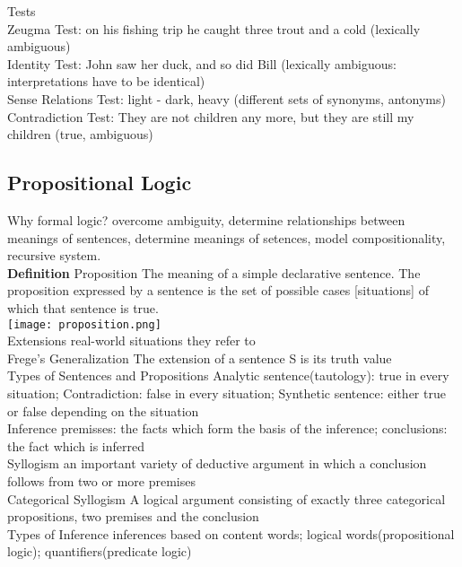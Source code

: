 \scriptsize{Tests}\\ {\tiny Zeugma Test: on his fishing trip he caught three trout and a cold (lexically ambiguous)\\
Identity Test: John saw her duck, and so did Bill (lexically ambiguous: interpretations have to be identical)\\
Sense Relations Test: light - dark, heavy (different sets of synonyms, antonyms)\\
Contradiction Test: They are not children any more, but they are still my children (true, ambiguous)
}
\subsection*{Propositional Logic}
Why formal logic? {\tiny overcome ambiguity, determine relationships between meanings of sentences, determine meanings of setences, model compositionality, recursive system.}\\
\textbf{Definition}
Proposition {\tiny The meaning of a simple declarative sentence. The proposition expressed by a sentence is the set of possible cases [situations] of which that sentence is true.} \\
\texttt{[image: proposition.png]}\\
Extensions {\tiny real-world situations they refer to} \\
Frege’s Generalization {\tiny The extension of a sentence S is its truth value} \\
Types of Sentences and Propositions {\tiny Analytic sentence(tautology): true in every situation; Contradiction: false in every situation; Synthetic sentence: either true or false depending on the situation}\\
Inference {\tiny premisses: the facts which form the basis of the inference; conclusions: the fact which is inferred}\\
Syllogism {\tiny an important variety of deductive argument in which a conclusion follows from two or more premises}\\
Categorical Syllogism {\tiny A logical argument consisting of exactly three categorical propositions, two premises and the conclusion}\\
Types of Inference {\tiny inferences based on content words; logical words(propositional logic); quantifiers(predicate logic)}
